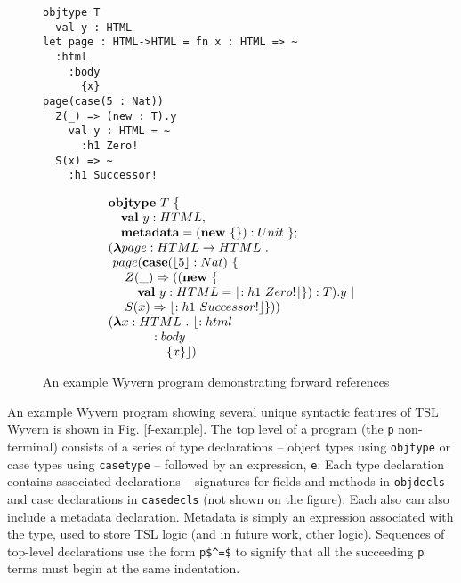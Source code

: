 \begin{figure}[t]
\begin{minipage}{.57\textwidth}
\begin{lstlisting}
objtype T
  val y : HTML
let page : HTML->HTML = fn x : HTML => ~
  :html
    :body
      {x}
page(case(5 : Nat))
  Z(_) => (new : T).y
    val y : HTML = ~
      :h1 Zero!
  S(x) => ~
    :h1 Successor!
\end{lstlisting}
\end{minipage}%
\begin{minipage}{.47\textwidth}
 \centering
\[
\begin{array}{l}
\keyw{objtype} \ T\ \{ \\
  ~~~\keyw{val}\ y : HTML, \\
  ~~~\keyw{metadata} = (\keyw{new}\ \{\}) : Unit\ \}; \\
  (\boldsymbol\lambda page : HTML \rightarrow HTML\ .\\
  ~page(\keyw{case}(\lfloor 5 \rfloor : Nat)\ \{ \\
  ~~~~Z(\_) \Rightarrow ((\keyw{new}\ \{ \\
    ~~~~~~~\keyw{val}\ y : HTML = \lfloor :h1\ Zero! \rfloor\}) : T).y\ | \\
   ~~~~S(x) \Rightarrow \lfloor :h1\ Successor! \rfloor\})) \\
  (\boldsymbol\lambda x : HTML\ .\ \lfloor :html \\
    ~~~~~~~~~~~:body \\
      ~~~~~~~~~~~~~~\{x\} \rfloor)
\end{array}
\]
\end{minipage}
\caption{An example Wyvern program demonstrating forward references}
\label{fig:fwd-ref}
\end{figure}
An example Wyvern program showing several unique syntactic features of TSL Wyvern is shown in Fig. \ref{f-example}. The top level of a program (the \lstinline{p} non-terminal) consists of a series of type declarations -- object types using \lstinline{objtype} or case types using \lstinline{casetype} -- followed by an expression, \lstinline{e}. Each type declaration contains associated declarations -- signatures for fields and methods in  \lstinline{objdecls} and case declarations in \lstinline{casedecls} (not shown on the figure). Each also can also include a metadata declaration. Metadata is simply an expression associated with the type, used to store TSL logic (and in future work, other logic). Sequences of top-level declarations use the form \lstinline{p$^=$} to signify that all the succeeding \lstinline{p} terms must begin at the same indentation.

